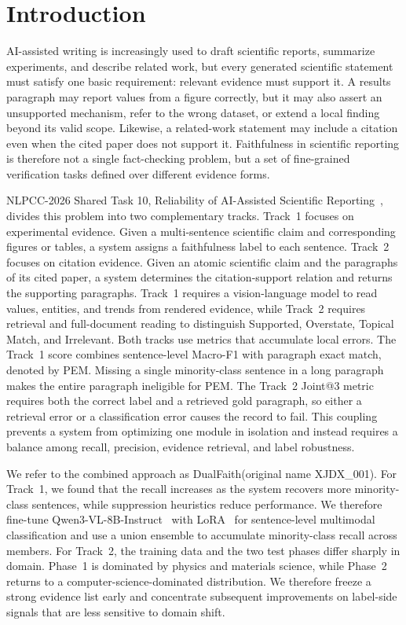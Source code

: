 \documentclass[runningheads]{llncs}
\makeatletter
\newcommand{\sys}{XJDX\_001}
\newcommand{\method}{DualFaith}
\newcommand{\mf}{Macro-F1}
\newcommand{\pem}{PEM}
\newcommand{\joint}{Joint@3}
\newcommand{\lab}[1]{\textsf{\small #1}}
\makeatother
\begin{document}
\section{Introduction}

AI-assisted writing is increasingly used to draft scientific reports, summarize experiments, and describe related work, but every generated scientific statement must satisfy one basic requirement: relevant evidence must support it. A results paragraph may report values from a figure correctly, but it may also assert an unsupported mechanism, refer to the wrong dataset, or extend a local finding beyond its valid scope. Likewise, a related-work statement may include a citation even when the cited paper does not support it. Faithfulness in scientific reporting is therefore not a single fact-checking problem, but a set of fine-grained verification tasks defined over different evidence forms.

NLPCC-2026 Shared Task 10, Reliability of AI-Assisted Scientific Reporting~\cite{nlpcc2026task10}, divides this problem into two complementary tracks. Track~1 focuses on experimental evidence. Given a multi-sentence scientific claim and corresponding figures or tables, a system assigns a faithfulness label to each sentence. Track~2 focuses on citation evidence. Given an atomic scientific claim and the paragraphs of its cited paper, a system determines the citation-support relation and returns the supporting paragraphs. Track~1 requires a vision-language model to read values, entities, and trends from rendered evidence, while Track~2 requires retrieval and full-document reading to distinguish \lab{Supported}, \lab{Overstate}, \lab{Topical Match}, and \lab{Irrelevant}. Both tracks use metrics that accumulate local errors. The Track~1 score combines sentence-level \mf{} with paragraph exact match, denoted by \pem{}. Missing a single minority-class sentence in a long paragraph makes the entire paragraph ineligible for \pem{}. The Track~2 \joint{} metric requires both the correct label and a retrieved gold paragraph, so either a retrieval error or a classification error causes the record to fail. This coupling prevents a system from optimizing one module in isolation and instead requires a balance among recall, precision, evidence retrieval, and label robustness.

We refer to the combined approach as \method{}(original name \sys{}). For Track~1, we found that the recall increases as the system recovers more minority-class sentences, while suppression heuristics reduce performance. We therefore fine-tune Qwen3-VL-8B-Instruct~\cite{qwen3vl2025} with LoRA~\cite{hu2021lora} for sentence-level multimodal classification and use a union ensemble to accumulate minority-class recall across members. For Track~2, the training data and the two test phases differ sharply in domain. Phase~1 is dominated by physics and materials science, while Phase~2 returns to a computer-science-dominated distribution. We therefore freeze a strong evidence list early and concentrate subsequent improvements on label-side signals that are less sensitive to domain shift.
\end{document}

